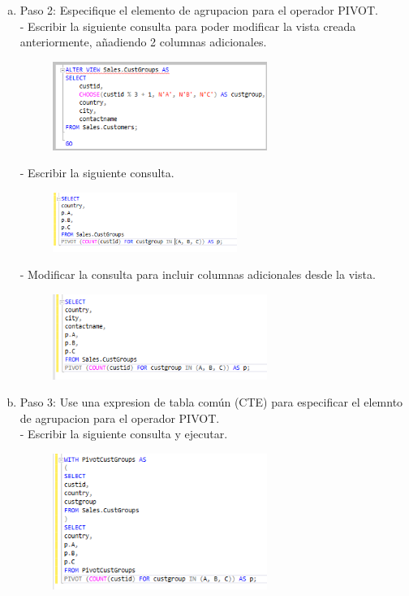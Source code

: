 \begin{enumerate}[1.]
\begin{enumerate}[a)]
\begin{figure}[H]
\begin{center}
		\end{center}
		\end{figure}
	\item Paso 2: Especifique el elemento de agrupacion para el operador PIVOT. \\
		-  Escribir la siguiente consulta para poder modificar la vista creada anteriormente, añadiendo 2 columnas adicionales. 
		\begin{figure}[H]
		\begin{center}
		\includegraphics[width=7cm]{./Imagenes/e1-2}
		\end{center}
		\end{figure}
		-  Escribir la siguiente consulta. 
		\begin{figure}[H]
		\begin{center}
		\includegraphics[width=6cm]{./Imagenes/c2}
		\end{center}
		\end{figure}
		-  Modificar la consulta para incluir columnas adicionales desde la vista. 
		\begin{figure}[H]
		\begin{center}
		\includegraphics[width=7cm]{./Imagenes/c3}
		\end{center}
		\end{figure}
	\item Paso 3: Use una expresion de tabla común (CTE) para especificar el elemnto de agrupacion para el operador PIVOT.\\
		-  Escribir la siguiente consulta y ejecutar. 
		\begin{figure}[H]
		\begin{center}
		\includegraphics[width=7cm]{./Imagenes/c4}

\end{center}
\end{figure}
\end{enumerate}
\end{enumerate}
